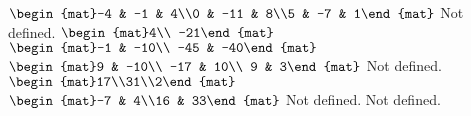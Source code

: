 \begin{Answer}
\begin{multicols}{2}
\Question $\begin{mat}-4 & -1 & 4\\0 & -11 & 8\\5 & -7 & 1\end{mat}$
\Question Not defined.
\Question $\begin{mat}4\\ -21\end{mat}$
\Question $\begin{mat}-1 & -10\\ -45 & -40\end{mat}$
\Question $\begin{mat}9 & -10\\ -17 & 10\\ 9 & 3\end{mat}$
\Question Not defined.
\Question $\begin{mat}17\\31\\2\end{mat}$
\Question $\begin{mat}-7 & 4\\16 & 33\end{mat}$
\Question Not defined.
\Question Not defined.
\EndCurrentQuestion
\end{multicols}
\end{Answer}
